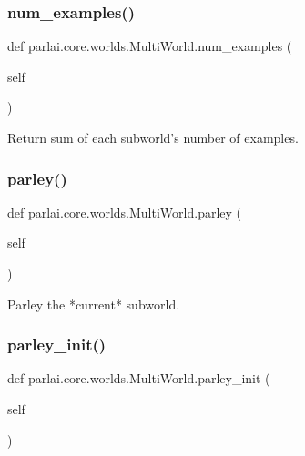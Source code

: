 \subsubsection{\texorpdfstring{num\+\_\+examples()}{num\_examples()}}
{\footnotesize\ttfamily def parlai.\+core.\+worlds.\+Multi\+World.\+num\+\_\+examples (\begin{DoxyParamCaption}\item[{}]{self }\end{DoxyParamCaption})}

\begin{DoxyVerb}Return sum of each subworld's number of examples.
\end{DoxyVerb}
 \mbox{\label{classparlai_1_1core_1_1worlds_1_1MultiWorld_aae71b8182e17a1579352a52b56614b64}} 
\subsubsection{\texorpdfstring{parley()}{parley()}}
{\footnotesize\ttfamily def parlai.\+core.\+worlds.\+Multi\+World.\+parley (\begin{DoxyParamCaption}\item[{}]{self }\end{DoxyParamCaption})}

\begin{DoxyVerb}Parley the *current* subworld.
\end{DoxyVerb}
 \mbox{\label{classparlai_1_1core_1_1worlds_1_1MultiWorld_a9f2f4de7791e3b295359039e9d26a523}} 
\subsubsection{\texorpdfstring{parley\+\_\+init()}{parley\_init()}}
{\footnotesize\ttfamily def parlai.\+core.\+worlds.\+Multi\+World.\+parley\+\_\+init (\begin{DoxyParamCaption}\item[{}]{self }\end{DoxyParamCaption})}

